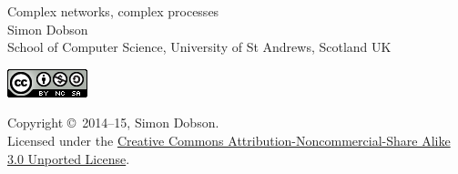 
\begin{titlepage}
  \Huge{Complex networks, complex processes}
  \\[1cm]
  \large{Simon Dobson \\ %
    School of Computer Science, University of St Andrews, Scotland UK}

  \vfill
  \begin{minipage}{1.0\linewidth}
    \parbox{0.2\linewidth}{%
      \includegraphics{cc-at-nc-sa.png}
    } %
    \hfill
    \parbox{0.7\linewidth}{%
      Copyright \copyright~2014--15, Simon Dobson.
      \\[0.5cm]
      Licensed under the
      \href{http://creativecommons.org/licenses/by-nc-sa/3.0}{Creative Commons Attribution-Noncommercial-Share Alike 3.0 Unported License}.
      \\[0.5cm]
      
    }
  \end{minipage}
\end{titlepage}

\newpage



\tableofcontents
\newpage





